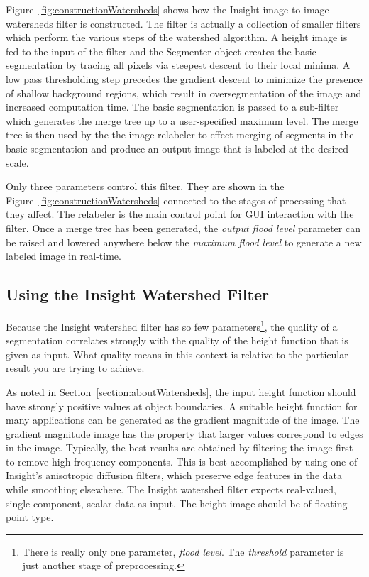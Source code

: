 Figure~\ref{fig:constructionWatersheds} shows how the Insight image-to-image
watersheds filter is constructed.  The filter is actually a collection of
smaller filters which perform the various steps of the watershed algorithm.  A
height image is fed to the input of the filter and the Segmenter object creates
the basic segmentation by tracing all pixels via steepest descent to their
local minima.  A low pass thresholding step precedes the gradient descent to
minimize the presence of shallow background regions, which result in
oversegmentation of the image and increased computation time.  The basic
segmentation is passed to a sub-filter which generates the merge tree up
to a user-specified maximum level.  The merge tree is then used by the the image
relabeler to effect merging of segments in the basic segmentation and
produce an output image that is labeled at the desired scale.

Only three parameters control this filter.  They are shown in the
Figure~\ref{fig:constructionWatersheds} connected to the stages of processing
that they affect.  The relabeler is the main control point for GUI
interaction with the filter.  Once a merge tree has been generated, the {\em
output flood level} parameter can be raised and lowered anywhere below the {\em
maximum flood level} to generate a new labeled image in real-time.

\subsection{Using the Insight Watershed Filter}
\label{sec:UsingWatersheds}
Because the Insight watershed filter has so few parameters\footnote{There is
really only one parameter, {\em flood level}.  The {\em threshold} parameter is
just another stage of preprocessing.}, the quality of a segmentation correlates
strongly with the quality of the height function that is given as input. What
quality means in this context is relative to the particular result you are
trying to achieve.

As noted in Section~\ref{section:aboutWatersheds}, the input height function
should have strongly positive values at object boundaries.  A suitable height
function for many applications can be generated as the gradient magnitude of
the image.  The gradient magnitude image has the property that larger values
correspond to edges in the image.  Typically, the best results are obtained by
filtering the image first to remove high frequency components.  This is best
accomplished by using one of Insight's anisotropic diffusion filters, which
preserve edge features in the data while smoothing elsewhere.  The Insight
watershed filter expects real-valued, single component, scalar data as input.
The height image should be of floating point type.

